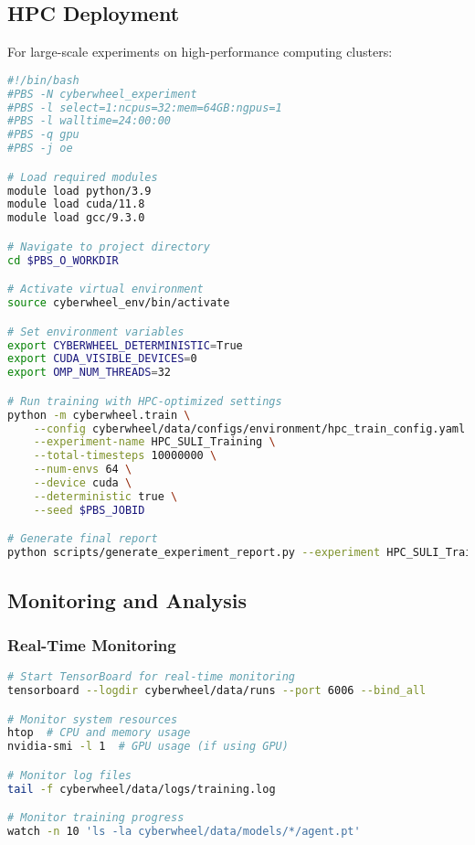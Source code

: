\documentclass[12pt,a4paper]{article}
\begin{document}
\subsection{HPC Deployment}

For large-scale experiments on high-performance computing clusters:

\begin{lstlisting}[language=bash, caption=HPC PBS Script]
#!/bin/bash
#PBS -N cyberwheel_experiment
#PBS -l select=1:ncpus=32:mem=64GB:ngpus=1
#PBS -l walltime=24:00:00
#PBS -q gpu
#PBS -j oe

# Load required modules
module load python/3.9
module load cuda/11.8
module load gcc/9.3.0

# Navigate to project directory
cd $PBS_O_WORKDIR

# Activate virtual environment
source cyberwheel_env/bin/activate

# Set environment variables
export CYBERWHEEL_DETERMINISTIC=True
export CUDA_VISIBLE_DEVICES=0
export OMP_NUM_THREADS=32

# Run training with HPC-optimized settings
python -m cyberwheel.train \
    --config cyberwheel/data/configs/environment/hpc_train_config.yaml \
    --experiment-name HPC_SULI_Training \
    --total-timesteps 10000000 \
    --num-envs 64 \
    --device cuda \
    --deterministic true \
    --seed $PBS_JOBID

# Generate final report
python scripts/generate_experiment_report.py --experiment HPC_SULI_Training
\end{lstlisting}

\subsection{Monitoring and Analysis}

\subsubsection{Real-Time Monitoring}
\begin{lstlisting}[language=bash, caption=Monitoring Commands]
# Start TensorBoard for real-time monitoring
tensorboard --logdir cyberwheel/data/runs --port 6006 --bind_all

# Monitor system resources
htop  # CPU and memory usage
nvidia-smi -l 1  # GPU usage (if using GPU)

# Monitor log files
tail -f cyberwheel/data/logs/training.log

# Monitor training progress
watch -n 10 'ls -la cyberwheel/data/models/*/agent.pt'
\end{lstlisting}
\end{document}
